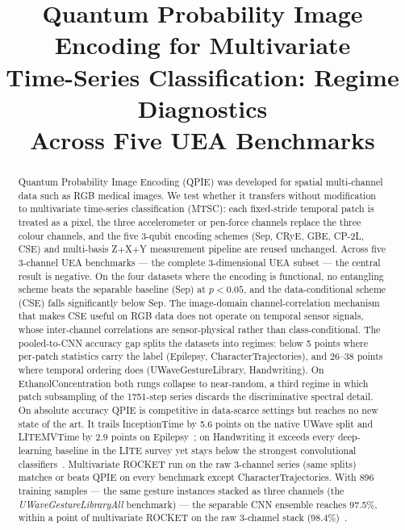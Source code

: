 \documentclass[conference,compsoc]{IEEEtran}
\begin{document}
\title{Quantum Probability Image Encoding for Multivariate\\
Time-Series Classification: Regime Diagnostics\\
Across Five UEA Benchmarks}

\author{%
}

\maketitle

\begin{abstract}
Quantum Probability Image Encoding (QPIE) was developed for spatial
multi-channel data such as RGB medical images. We test whether it
transfers without modification to multivariate time-series
classification (MTSC): each fixed-stride temporal patch is treated as
a pixel, the three accelerometer or pen-force channels replace the
three colour channels, and the five 3-qubit encoding schemes (Sep,
CRyE, GBE, CP-2L, CSE) and multi-basis Z$+$X$+$Y measurement pipeline
are reused unchanged.
Across five 3-channel UEA benchmarks --- the complete 3-dimensional
UEA subset --- the central result is negative.
On the four datasets where the encoding is functional, no entangling
scheme beats the separable baseline (Sep) at $p < 0.05$, and the
data-conditional scheme (CSE) falls significantly below Sep. The
image-domain channel-correlation mechanism that makes CSE useful on
RGB data does not operate on temporal sensor signals, whose
inter-channel correlations are sensor-physical rather than
class-conditional.
The pooled-to-CNN accuracy gap splits the datasets into regimes:
below 5 points where per-patch statistics carry the label
(Epilepsy, CharacterTrajectories), and 26--38 points where temporal
ordering does (UWaveGestureLibrary, Handwriting). On
EthanolConcentration both rungs collapse to near-random, a third
regime in which patch subsampling of the 1751-step series discards the
discriminative spectral detail.
On absolute accuracy QPIE is competitive in data-scarce settings but
reaches no new state of the art. It trails InceptionTime by 5.6 points
on the native UWave split and LITEMVTime by 2.9 points on
Epilepsy~\cite{ismail2025lite}; on Handwriting it exceeds every
deep-learning baseline in the LITE survey yet stays below the
strongest convolutional classifiers~\cite{ruiz2020bakeoff}.
Multivariate ROCKET run on the raw 3-channel series (same splits)
matches or beats QPIE on every benchmark except CharacterTrajectories.
With 896 training samples --- the same gesture instances stacked as
three channels (the \textit{UWaveGestureLibraryAll} benchmark) --- the
separable CNN ensemble reaches 97.5\%, within a point of multivariate
ROCKET on the raw 3-channel stack (98.4\%)~\cite{dempster2020rocket}.
\end{abstract}
\end{document}
